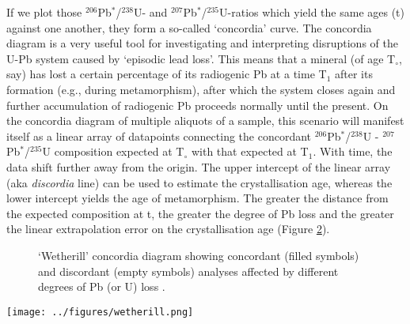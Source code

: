 If we plot those $^{206}$Pb$^*$/$^{238}$U- and
$^{207}$Pb$^*$/$^{235}$U-ratios which yield the same ages (t) against
one another, they form a so-called `concordia' curve. The concordia
diagram is a very useful tool for investigating and interpreting
disruptions of the U-Pb system caused by `episodic lead loss'. This
means that a mineral (of age T$_\circ$, say) has lost a certain
percentage of its radiogenic Pb at a time T$_1$ after its formation
(e.g., during metamorphism), after which the system closes again and
further accumulation of radiogenic Pb proceeds normally until the
present.  On the concordia diagram of multiple aliquots of a sample,
this scenario will manifest itself as a linear array of datapoints
connecting the concordant $^{206}$Pb$^*$/$^{238}$U -
$^{207}$Pb$^*$/$^{235}$U composition expected at T$_\circ$ with that
expected at T$_1$.  With time, the data shift further away from the
origin.  The upper intercept of the linear array (aka \emph{discordia}
line) can be used to estimate the crystallisation age, whereas the
lower intercept yields the age of metamorphism.  The greater the
distance from the expected composition at t, the greater the degree of
Pb loss and the greater the linear extrapolation error on the
crystallisation age (Figure \ref{fig:wetherill}).

\ifpdf
\ifuclnotes
\begin{figure}[!ht]
  \centering
  \def\svgwidth{.7\textwidth}
  
  \caption{`Wetherill' concordia diagram showing concordant (filled
    symbols) and discordant (empty symbols) analyses affected by
    different degrees of Pb (or U) loss \citep[modified
      from][]{allegre2008}.}
  \label{fig:wetherill}
\end{figure}
\else %
\begin{figure}[!ht]
\noindent\begin{minipage}[t]{.5\textwidth}
\strut\vspace*{-\baselineskip}\newline
\def\svgwidth{\textwidth}

\end{minipage}
\begin{minipage}[t]{.5\textwidth}
  \label{fig:wetherill}
\end{minipage}
\end{figure}
\fi %
\else
\texttt{[image: ../figures/wetherill.png]}
  \label{fig:wetherill}
\fi

